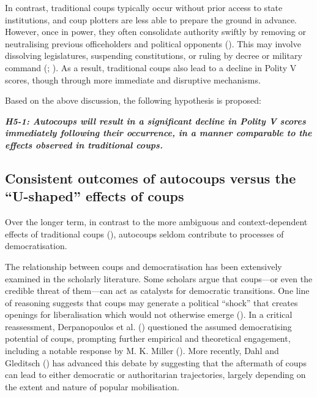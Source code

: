 \documentclass[
  12pt,
]{report}
\begin{document}
In contrast, traditional coups typically occur without prior access to
state institutions, and coup plotters are less able to prepare the
ground in advance. However, once in power, they often consolidate
authority swiftly by removing or neutralising previous officeholders and
political opponents (). This
may involve dissolving legislatures, suspending constitutions, or ruling
by decree or military command
(;
). As a result,
traditional coups also lead to a decline in Polity V scores, though
through more immediate and disruptive mechanisms.

Based on the above discussion, the following hypothesis is proposed:

\textbf{\emph{H5-1: Autocoups will result in a significant decline in
Polity V scores immediately following their occurrence, in a manner
comparable to the effects observed in traditional coups.}}

\subsection*{Consistent outcomes of autocoups versus the ``U-shaped''
effects of
coups}\label{consistent-outcomes-of-autocoups-versus-the-u-shaped-effects-of-coups}

Over the longer term, in contrast to the more ambiguous and
context-dependent effects of traditional coups
(), autocoups seldom
contribute to processes of democratisation.

The relationship between coups and democratisation has been extensively
examined in the scholarly literature. Some scholars argue that
coups---or even the credible threat of them---can act as catalysts for
democratic transitions. One line of reasoning suggests that coups may
generate a political ``shock'' that creates openings for liberalisation
which would not otherwise emerge (). In a critical reassessment, Derpanopoulos et al.
() questioned the assumed
democratising potential of coups, prompting further empirical and
theoretical engagement, including a notable response by M. K. Miller
(). More recently, Dahl and Gleditsch
() has advanced this debate by suggesting
that the aftermath of coups can lead to either democratic or
authoritarian trajectories, largely depending on the extent and nature
of popular mobilisation.
\end{document}
